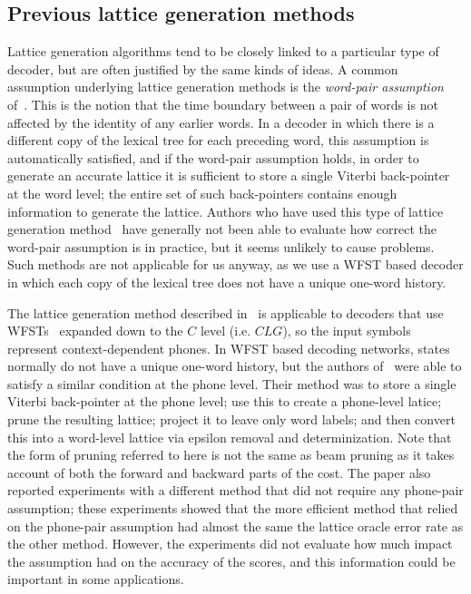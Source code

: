\documentclass{article}
\begin{document}
\subsection{Previous lattice generation methods}

Lattice generation algorithms tend to be closely linked to a particular type of decoder,
but are often justified by the same kinds of ideas.
A common assumption underlying lattice generation methods is the {\em word-pair assumption}
of~\cite{ney_word_graph}.  This is the notion that the time boundary between a pair of words
is not affected by the identity of any earlier words.  In a decoder in which there is
a different copy of the lexical tree for each preceding word, this assumption is automatically
satisfied, and if the word-pair assumption holds, in order to generate an accurate lattice it is
sufficient to store a single Viterbi back-pointer at the word level; the entire set of
such back-pointers contains enough information to generate the lattice.  Authors who have used
this type of lattice generation method~\cite{ney_word_graph,odell_thesis} have generally
not been able to evaluate how correct the word-pair assumption is in practice, but it seems
unlikely to cause problems.  Such methods are not applicable for us anyway, as we
use a WFST based decoder in which each copy of the lexical tree does not have a unique
one-word history.

The lattice generation method described in~\cite{efficient_general} 
is applicable to decoders that use WFSTs~\cite{wfst}
expanded down to the $C$ level (i.e. $CLG$), so the input symbols represent
context-dependent phones.  In WFST based decoding networks, states normally do
not have a unique one-word history, but the authors of~\cite{efficient_general}
were able to satisfy a similar condition at the phone level.  Their method was
to store a single Viterbi back-pointer at the phone level; use this to 
create a phone-level latice; prune the resulting
lattice; project it to leave only word labels; and then convert this into a word-level
lattice via epsilon removal and determinization.
Note that the form of pruning referred to here is not the same as beam pruning as
it takes account of both the forward and backward parts of the cost.
The paper also reported experiments with a different method that did not require any
phone-pair assumption; these experiments showed that the more
efficient method that relied on the phone-pair assumption
had almost the same the lattice oracle error rate as the other method.  However, the 
experiments did not evaluate how much impact the assumption had on the accuracy of the scores, 
and this information could be important in some applications.
\end{document}
